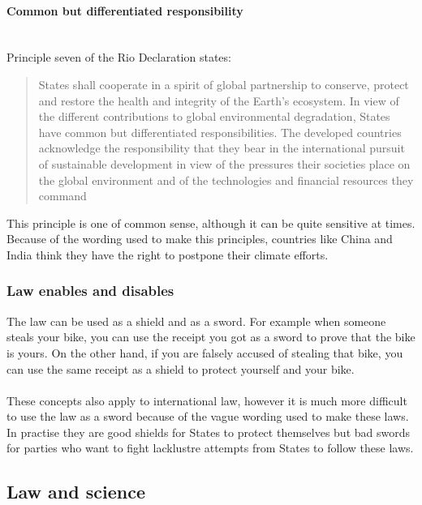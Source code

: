 \documentclass[../summary.tex]{subfiles}
\begin{document}
			\paragraph{Common but differentiated responsibility}\mbox{}\\
				\label{par:13-comm-diff-res}
				Principle seven of the Rio Declaration states:
				\begin{quote}
					States shall cooperate in a spirit of global partnership to conserve, protect and restore the health and integrity of the Earth's ecosystem. In view of the different contributions to global environmental degradation, States have common but differentiated responsibilities. The developed countries acknowledge the responsibility that they bear in the international pursuit of sustainable development in view of the pressures their societies place on the global environment and of the technologies and financial resources they command
				\end{quote}
				This principle is one of common sense, although it can be quite sensitive at times. Because of the wording used to make this principles, countries like China and India think they have the right to postpone their climate efforts. 
				
			\subsubsection{Law enables and disables}
				The law can be used as a shield and as a sword. For example when someone steals your bike, you can use the receipt you got as a sword to prove that the bike is yours. On the other hand, if you are falsely accused of stealing that bike, you can use the same receipt as a shield to protect yourself and your bike. \\
				\\
				These concepts also apply to international law, however it is much more difficult to use the law as a sword because of the vague wording used to make these laws. In practise they are good shields for States to protect themselves but bad swords for parties who want to fight lacklustre attempts from States to follow these laws. 
				\newpage
				
	\subsection{Law and science}
\end{document}
